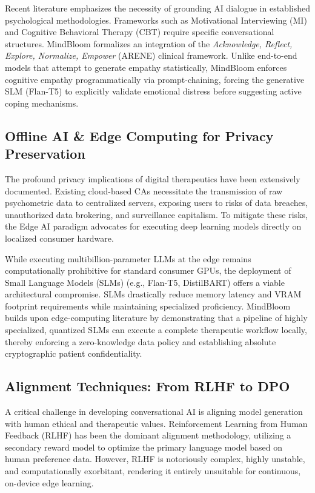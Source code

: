 \documentclass[12pt,twoside]{article}
\begin{document}
Recent literature emphasizes the necessity of grounding AI dialogue in established psychological methodologies. Frameworks such as Motivational Interviewing (MI) and Cognitive Behavioral Therapy (CBT) require specific conversational structures. MindBloom formalizes an integration of the \textit{Acknowledge, Reflect, Explore, Normalize, Empower} (ARENE) clinical framework. Unlike end-to-end models that attempt to generate empathy statistically, MindBloom enforces cognitive empathy programmatically via prompt-chaining, forcing the generative SLM (Flan-T5) to explicitly validate emotional distress before suggesting active coping mechanisms.

\subsection{Offline AI \& Edge Computing for Privacy Preservation}

The profound privacy implications of digital therapeutics have been extensively documented. Existing cloud-based CAs necessitate the transmission of raw psychometric data to centralized servers, exposing users to risks of data breaches, unauthorized data brokering, and surveillance capitalism. To mitigate these risks, the Edge AI paradigm advocates for executing deep learning models directly on localized consumer hardware.

While executing multibillion-parameter LLMs at the edge remains computationally prohibitive for standard consumer GPUs, the deployment of Small Language Models (SLMs) (e.g., Flan-T5, DistilBART) offers a viable architectural compromise. SLMs drastically reduce memory latency and VRAM footprint requirements while maintaining specialized proficiency. MindBloom builds upon edge-computing literature by demonstrating that a pipeline of highly specialized, quantized SLMs can execute a complete therapeutic workflow locally, thereby enforcing a zero-knowledge data policy and establishing absolute cryptographic patient confidentiality.

\subsection{Alignment Techniques: From RLHF to DPO}

A critical challenge in developing conversational AI is aligning model generation with human ethical and therapeutic values. Reinforcement Learning from Human Feedback (RLHF) has been the dominant alignment methodology, utilizing a secondary reward model to optimize the primary language model based on human preference data. However, RLHF is notoriously complex, highly unstable, and computationally exorbitant, rendering it entirely unsuitable for continuous, on-device edge learning.
\end{document}
